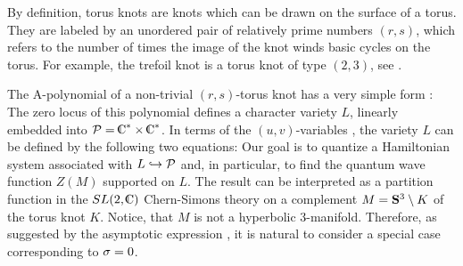 \ifig{}
{}

By definition, torus knots are knots which can be drawn
on the surface of a torus. They are labeled by an unordered
pair of relatively prime numbers $(r,s)$, which refers to
the number of times the image of the knot winds basic
cycles on the torus. For example, the trefoil knot is a torus
knot of type $(2,3)$, see \ttknot.

The A-polynomial of a non-trivial $(r,s)$-torus knot
has a very simple form \CCGLS:
%
\eqn{}
%
The zero locus of this polynomial defines a character
variety $L$, linearly embedded into $\CP = \IC^* \times \IC^*$.
In terms of the $(u,v)$-variables \uvdef,
the variety $L$ can be defined by the following two equations:
%
\eqn{}
%
Our goal is to quantize a Hamiltonian system
associated with $L \hookrightarrow \CP$ and, in particular,
to find the quantum wave function $Z(M)$ supported on $L$.
The result can be interpreted as a partition
function in the $SL(2,\IC)$ Chern-Simons theory on a complement
$M = \S^3 \setminus K$ of the torus knot $K$.
Notice, that $M$ is not a hyperbolic 3-manifold.
Therefore, as suggested by the asymptotic expression \semiclassz,
it is natural to consider a special case corresponding to $\s=0$.

%
%
%

